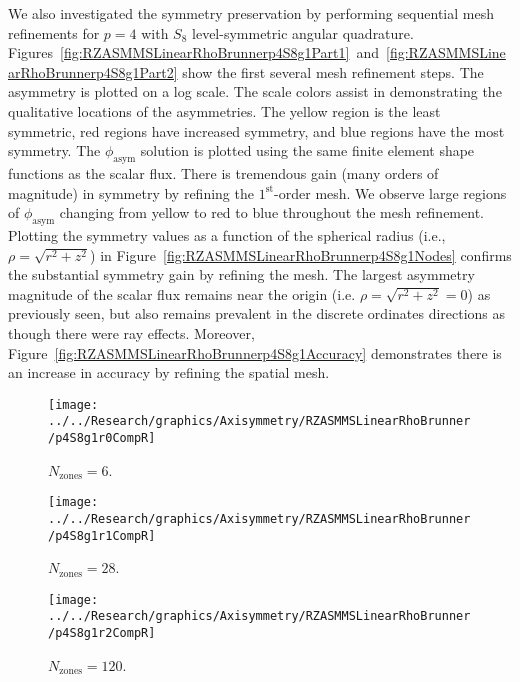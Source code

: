 \documentclass[12pt,letterpaper]{article}
\begin{document}
\FloatBarrier

We also investigated the symmetry preservation by performing sequential mesh refinements for $p=4$ with $S_8$ level-symmetric angular quadrature. Figures~\ref{fig:RZASMMSLinearRhoBrunnerp4S8g1Part1}~and~\ref{fig:RZASMMSLinearRhoBrunnerp4S8g1Part2} show the first several mesh refinement steps. The asymmetry is plotted on a log scale. The scale colors assist in demonstrating the qualitative locations of the asymmetries. The yellow region is the least symmetric, red regions have increased symmetry, and blue regions have the most symmetry. The $\phi_\text{asym}$ solution is plotted using the same finite element shape functions as the scalar flux. There is tremendous gain (many orders of magnitude) in symmetry by refining the $1^\text{st}$-order mesh. We observe large regions of $\phi_\text{asym}$ changing from yellow to red to blue throughout the mesh refinement. Plotting the symmetry values as a function of the spherical radius (i.e., $\rho=\sqrt{r^2+z^2}$) in Figure~\ref{fig:RZASMMSLinearRhoBrunnerp4S8g1Nodes} confirms the substantial symmetry gain by refining the mesh. The largest asymmetry magnitude of the scalar flux remains near the origin (i.e. $\rho=\sqrt{r^2+z^2}=0$) as previously seen, but also remains prevalent in the discrete ordinates directions as though there were ray effects. Moreover, Figure~\ref{fig:RZASMMSLinearRhoBrunnerp4S8g1Accuracy} demonstrates there is an increase in accuracy by refining the spatial mesh.

\begin{sidewaysfigure}[!htb]
\centering
\begin{subfigure}{0.33\textwidth}
\texttt{[image: ../../Research/graphics/Axisymmetry/RZASMMSLinearRhoBrunner/p4S8g1r0CompR]}
\caption{$N_\text{zones}=6$.}
\end{subfigure}%
\begin{subfigure}{0.33\textwidth}
\texttt{[image: ../../Research/graphics/Axisymmetry/RZASMMSLinearRhoBrunner/p4S8g1r1CompR]}
\caption{$N_\text{zones}=28$.}
\end{subfigure}%
\begin{subfigure}{0.33\textwidth}
\texttt{[image: ../../Research/graphics/Axisymmetry/RZASMMSLinearRhoBrunner/p4S8g1r2CompR]}
\caption{$N_\text{zones}=120$.}
\end{subfigure}
\caption{Relative asymmetry for $p=4$ finite elements on a $1^\text{st}$-order mesh for $S_8$ level-symmetric angular quadrature for $N_\text{zones}=\{6,28,120\}$.}
\label{fig:RZASMMSLinearRhoBrunnerp4S8g1Part1}
\end{sidewaysfigure}
\end{document}
